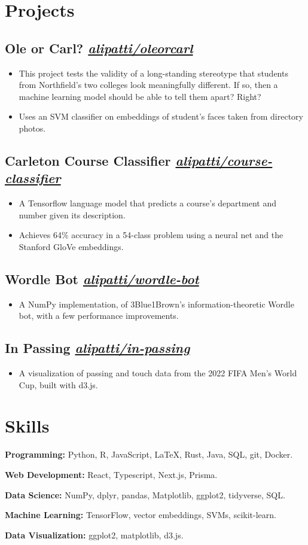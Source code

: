 \documentclass{ali-resume}
\begin{document}
\section{Projects}

\newcommand{\project}[2]{%
	\subsection{#1
		\hfill
		\normalfont \small \faicon{github}
		\href{http://github.com/alipatti/#2}{\textit{alipatti/#2}}
	}}

\project{Ole or Carl?}{oleorcarl}

\begin{itemize}
	\item This project tests the validity of a long-standing stereotype that students from Northfield's two colleges look meaningfully different. If so, then a machine learning model should be able to tell them apart? Right?
	\item Uses an SVM classifier on embeddings of student's faces taken from directory photos.
\end{itemize}

\project{Carleton Course Classifier}{course-classifier}

\begin{itemize}
	\item A Tensorflow language model that predicts a course's department and number given its description.
	\item Achieves 64\% accuracy in a 54-class problem using a neural net and the Stanford GloVe embeddings.
\end{itemize}

\project{Wordle Bot}{wordle-bot}

\begin{itemize}
	\item A NumPy implementation, of 3Blue1Brown's information-theoretic Wordle bot, with a few performance improvements.
\end{itemize}

\project{In Passing}{in-passing}

\begin{itemize}
	\item A visualization of passing and touch data from the 2022 FIFA Men's World Cup, built with d3.js.
\end{itemize}

\section{Skills}

\textbf{Programming:} Python, R, JavaScript, \LaTeX, Rust, Java, SQL, git, Docker.

\textbf{Web Development:} React, Typescript, Next.js, Prisma.

\textbf{Data Science:} NumPy, dplyr, pandas, Matplotlib, ggplot2, tidyverse, SQL.

\textbf{Machine Learning:} TensorFlow, vector embeddings, SVMs, scikit-learn.

\textbf{Data Visualization:} ggplot2, matplotlib, d3.js.

\end{document}
